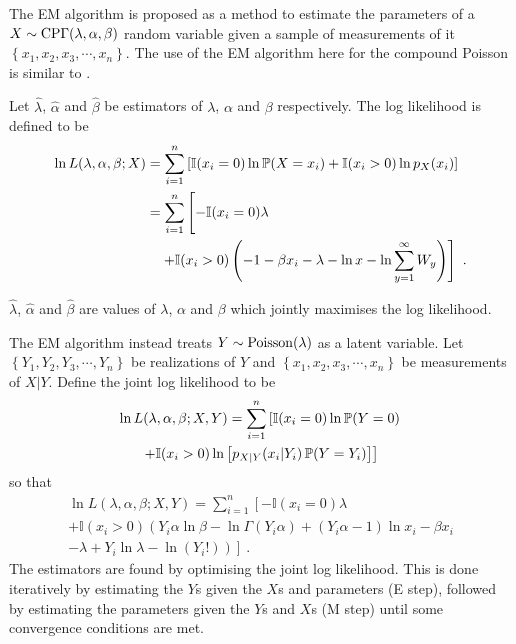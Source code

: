 The EM algorithm \citep{dempster1977maximum} is proposed as a method to estimate the parameters of a $X\sim\operatorname{CP\Gamma}(\lambda,\alpha,\beta)$ random variable given a sample of measurements of it $\left\{x_1,x_2,x_3,\cdots,x_n\right\}$. The use of the EM algorithm here for the compound Poisson is similar to \cite{elbakri2003statistical, xu2009electronic}.

Let $\widehat{\lambda}$, $\widehat{\alpha}$ and $\widehat{\beta}$ be estimators of $\lambda$, $\alpha$ and $\beta$ respectively. The log likelihood is defined to be
\begin{align}
  \ln L(\lambda,\alpha,\beta;X) &= \sum_{i=1}^n
  \left[
    \mathbb{I}(x_i=0)\ln \prob(X=x_i)
    +\mathbb{I}(x_i>0)\ln p_X(x_i)
  \right]
  \nonumber \\
  &\!\begin{multlined}[b]
  =
    \sum_{i=1}^n
    \left[
      -\mathbb{I}(x_i=0)\lambda
      \vphantom{\sum_i^i}
    \right.
    {}\\
    \left.
      +\mathbb{I}(x_i>0)\left(
      -1-\beta x_i-\lambda-\ln x -\ln\sum_{y=1}^\infty W_y
      \right)
    \right] \ .
  \end{multlined}
\end{align}

$\widehat{\lambda}$, $\widehat{\alpha}$ and $\widehat{\beta}$ are values of $\lambda$, $\alpha$ and $\beta$ which jointly maximises the log likelihood.

The EM algorithm \citep{dempster1977maximum} instead treats $Y\sim\operatorname{Poisson}(\lambda)$ as a latent variable. Let $\left\{Y_1,Y_2,Y_3,\cdots, Y_n\right\}$ be realizations of $Y$ and $\left\{x_1,x_2,x_3,\cdots, x_n\right\}$ be measurements of $X|Y$. Define the joint log likelihood to be
\begin{multline*}
  \ln L(\lambda,\alpha,\beta;X,Y)
  =
  \sum_{i=1}^n
  \left[
    \mathbb{I}(x_i=0)
    \ln
    \operatorname{\mathbb{P}}(Y=0)
  \right.
  \\
  \left.
    +
    \mathbb{I}(x_i>0)
    \ln
    \left[
      p_{X|Y}(x_i|Y_i)\operatorname{\mathbb{P}}(Y=Y_i)
    \right]
  \right]
\end{multline*}
so that
\begin{multline}
  \ln L(\lambda,\alpha,\beta;X,Y)=
  \sum_{i=1}^n
  \left[
    -\mathbb{I}(x_i=0)
    \lambda
  \right.
  \\
  \left.+
    \mathbb{I}(x_i>0)
    \left(
      Y_i\alpha\ln\beta-\ln\Gamma(Y_i\alpha)+(Y_i\alpha-1)\ln x_i - \beta x_i
    \right.
  \right.
  \\
  \left.
    \left.  
      - \lambda + Y_i \ln \lambda - \ln(Y_i!)
    \right)
  \right]
  \ .
\end{multline}
The estimators are found by optimising the joint log likelihood. This is done iteratively by estimating the $Y$s given the $X$s and parameters (E step), followed by estimating the parameters given the $Y$s and $X$s (M step) until some convergence conditions are met.

